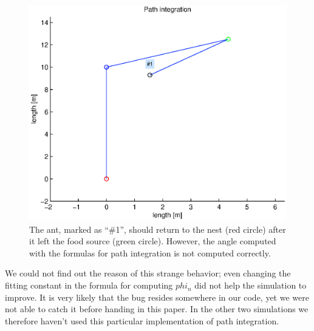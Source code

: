 \documentclass[11pt]{article}
\begin{document}
\begin{figure}[h!]
	\centering
	\includegraphics[width=.8\textwidth]{../sources/results/pathIntegrationResults/animation.eps}
	\caption{The ant, marked as ``\#1'', should return to the nest (red circle) after it left the food source (green circle). However, the angle computed with the formulas for path integration is not computed correctly.}
\end{figure}

We could not find out the reason of this strange behavior; even changing the fitting constant in the formula for computing $phi_n$ did not help the simulation to improve. It is very likely that the bug resides somewhere in our code, yet we were not able to catch it before handing in this paper. In the other two simulations we therefore haven't used this particular implementation of path integration.
\end{document}
